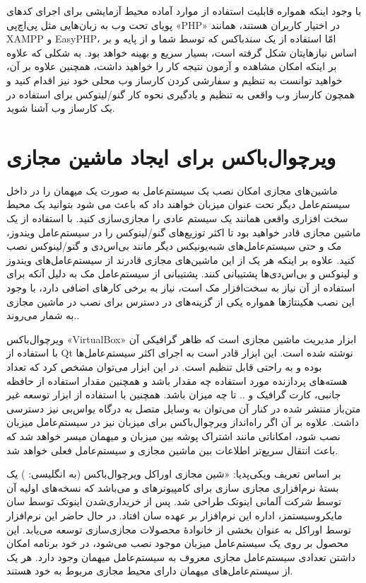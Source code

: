 با وجود اینکه همواره قابلیت استفاده از موارد آماده محیط آزمایشی برای اجرای کدهای پویای تحت وب به زبان‌هایی مثل پی‌اچ‌پی «PHP» در اختیار کاربران هستند، همانند XAMPP و EasyPHP، امّا استفاده از یک سند‌باکس که توسط شما و از پایه و بر اساس نیازهایتان شکل گرفته است، بسیار سریع و بهینه خواهد بود. به شکلی که علاوه بر اینکه امکان مشاهده و آزمون نتیجه کار را خواهید داشت، همچنین علاوه بر آن، خواهید توانست به تنظیم و سفارشی کردن کارساز وب محلی خود نیز اقدام کنید و همچون کارساز وب واقعی به تنظیم و یادگیری نحوه کار گنو/لینوکس برای استفاده در یک کارساز وب آشنا شوید.

\section{ویرچوال‌باکس برای ایجاد ماشین مجازی}
ماشین‌های مجازی امکان نصب یک سیستم‌عامل به صورت یک میهمان را در داخل سیستم‌عامل دیگر تحت عنوان میزبان خواهند داد که باعث می شود بتوانید یک محیط سخت افزاری واقعی همانند یک سیستم عادی را مجازی‌سازی کنید. با استفاده از یک ماشین مجازی قادر خواهید بود تا اکثر توزیع‌های گنو/لینوکس را در سیستم‌عامل ویندوز، مک و حتی سیستم‌عامل‌های شبه‌یونیکس دیگر مانند بی‌اس‌دی و گنو/لینوکس نصب کنید. علاوه بر اینکه هر یک از این ماشین‌های مجازی  قادرند از سیستم‌عامل‌های ویندوز و لینوکس و بی‌اس‌دی‌ها پشتیبانی کنند.  پشتیبانی از سیستم‌عامل مک به دلیل آنکه برای استفاده از آن نیاز به سخت‌افزار مک است، نیاز به برخی کارهای اضافی دارد، با وجود این نصب هکینتاژها همواره یکی از گزینه‌های در دسترس برای نصب در ماشین مجازی به شمار می‌روند..

ویرچوال‌باکس «VirtualBox» ابزار مدیریت ماشین مجازی است که ظاهر گرافیکی آن با استفاده از Qt نوشته شده است. این ابزار قادر است به اجرای اکثر سیستم‌عامل‌ها بوده و به راحتی قابل تنظیم است. در این ابزار می‌توان مشخص کرد که تعداد هسته‌های پردازنده مورد استفاده چه مقدار باشد و همچنین مقدار استفاده از حافظه جانبی، کارت گرافیک و .. تا چه میزان باشد. همچنین با استفاده از ابزار توسعه غیر متن‌باز منتشر شده در کنار آن می‌توان به وسایل متصل به درگاه یو‌اس‌بی نیز دسترسی داشت. علاوه بر آن اگر راه‌انداز ویرچوال‌باکس برای میزبان نیز در سیستم‌عامل میزبان نصب شود، امکاناتی مانند اشتراک پوشه بین میزبان و میهمان میسر خواهد شد که باعث انتقال سریع‌تر اطلاعات بین ماشین مجازی و سیستم‌عامل فعلی خواهد شد.

بر اساس تعریف ویکی‌پدیا: «شین مجازی اوراکل ویرچوال‌باکس (به انگلیسی:
) یک بستهٔ نرم‌افزاری مجازی سازی برای کامپیوترهای 
 و 
می‌باشد که نسخه‌های اولیه آن توسط شرکت آلمانی اینوتک طراحی شد. پس از خریداری‌شدن اینوتک توسط سان مایکروسیستمز، اداره این نرم‌افزار بر عهده سان افتاد. در حال حاضر این نرم‌افزار توسط اوراکل به عنوان بخشی از خانوادهٔ محصولات مجازی‌سازی توسعه می‌یابد. این محصول بر روی یک سیستم‌عامل میزبان موجود نصب می‌شود، در خود برنامه امکان داشتن تعدادی سیستم‌عامل مجازی معروف به سیستم‌عامل میهمان وجود دارد. هر یک از سیستم‌عامل‌های میهمان دارای محیط مجازی مربوط به خود هستند.

